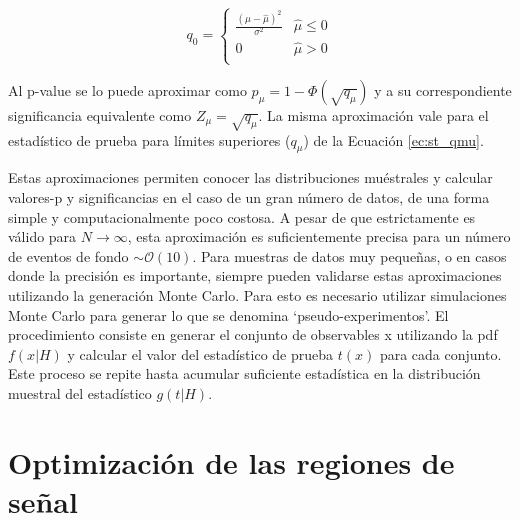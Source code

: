 \begin{equation}
	q_{0}=
	\begin{cases}
		\frac{(\mu-\hat{\mu})^{2}}{\sigma^{2}} & \hat{\mu}\le 0 \\
		0 & \hat{\mu}>0 \\
	\end{cases}
\end{equation}

Al p-value se lo puede aproximar como $p_{\mu}=1-\Phi(\sqrt{q_{\mu}})$ y a su correspondiente significancia equivalente como $Z_{\mu}=\sqrt{q_{\mu}}$. La misma aproximación vale para el estadístico de prueba para límites superiores ($q_\mu$) de la Ecuación \ref{ec:st_qmu}.

Estas aproximaciones permiten conocer las distribuciones muéstrales y calcular valores-p y significancias en el caso de un gran número de datos, de una forma simple y computacionalmente poco
costosa. A pesar de que estrictamente es válido para $N\to\infty$, esta aproximación es suficientemente
precisa para un número de eventos de fondo $\sim \mathcal{O}(10)$.
Para muestras de datos muy pequeñas, o en casos donde la precisión es importante, siempre pueden
validarse estas aproximaciones utilizando la generación Monte Carlo. Para esto es necesario utilizar
simulaciones Monte Carlo para generar lo que se denomina `pseudo-experimentos'. El procedimiento
consiste en generar el conjunto de observables x utilizando la pdf $f(x|H)$ y calcular el valor del
estadístico de prueba $t(x)$ para cada conjunto. Este proceso se repite hasta acumular suficiente
estadística en la distribución muestral del estadístico $g(t|H)$.

\section{Optimización de las regiones de señal}\label{sec:exp_sig}


